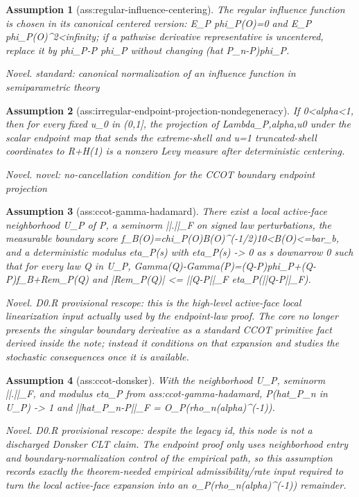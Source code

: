 \documentclass{article}
\newtheorem{assumption}{Assumption}
\begin{document}
\begin{assumption}[ass:regular-influence-centering]\label{ass:regular-influence-centering}
The regular influence function is chosen in its canonical centered version: E_P phi_P(O)=0 and E_P phi_P(O)^2<infinity; if a pathwise derivative representative is uncentered, replace it by phi_P-P phi_P without changing (hat P_n-P)phi_P.
\par\smallskip\noindent\emph{Novel.} standard: canonical normalization of an influence function in semiparametric theory
\end{assumption}

\begin{assumption}[ass:irregular-endpoint-projection-nondegeneracy]\label{ass:irregular-endpoint-projection-nondegeneracy}
If 0<alpha<1, then for every fixed u_0 in (0,1], the projection of Lambda_P,alpha,u0 under the scalar endpoint map that sends the extreme-shell and u=1 truncated-shell coordinates to R+H(1) is a nonzero Levy measure after deterministic centering.
\par\smallskip\noindent\emph{Novel.} novel: no-cancellation condition for the CCOT boundary endpoint projection
\end{assumption}

\begin{assumption}[ass:ccot-gamma-hadamard]\label{ass:ccot-gamma-hadamard}
There exist a local active-face neighborhood U_P of P, a seminorm ||.||_F on signed law perturbations, the measurable boundary score f_B(O)=chi_P(O)B(O)^(-1/2)1{0<B(O)<=bar_b}, and a deterministic modulus eta_P(s) with eta_P(s) -> 0 as s downarrow 0 such that for every law Q in U_P, Gamma(Q)-Gamma(P)=(Q-P)phi_P+(Q-P)f_B+Rem_P(Q) and |Rem_P(Q)| <= ||Q-P||_F eta_P(||Q-P||_F).
\par\smallskip\noindent\emph{Novel.} D0.R provisional rescope: this is the high-level active-face local linearization input actually used by the endpoint-law proof. The core no longer presents the singular boundary derivative as a standard CCOT primitive fact derived inside the note; instead it conditions on that expansion and studies the stochastic consequences once it is available.
\end{assumption}

\begin{assumption}[ass:ccot-donsker]\label{ass:ccot-donsker}
With the neighborhood U_P, seminorm ||.||_F, and modulus eta_P from ass:ccot-gamma-hadamard, P(hat_P_n in U_P) -> 1 and ||hat_P_n-P||_F = O_P(rho_n(alpha)^(-1)).
\par\smallskip\noindent\emph{Novel.} D0.R provisional rescope: despite the legacy id, this node is not a discharged Donsker CLT claim. The endpoint proof only uses neighborhood entry and boundary-normalization control of the empirical path, so this assumption records exactly the theorem-needed empirical admissibility/rate input required to turn the local active-face expansion into an o_P(rho_n(alpha)^(-1)) remainder.
\end{assumption}
\end{document}

